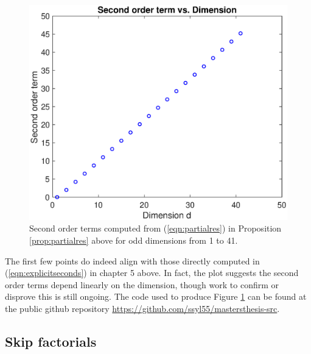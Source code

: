 \documentclass[11pt]{article}
\theoremstyle{mythm}
\begin{document}
\begin{figure}[h!]
\centerline{\includegraphics[width=12cm]{secs.eps}}\caption{\label{fig:secondsplot} Second order terms computed from (\ref{eqn:partialres}) in Proposition \ref{prop:partialres} above for odd dimensions from 1 to 41.}
\end{figure}

The first few points do indeed align with those directly computed in (\ref{eqn:explicitseconds}) in chapter 5 above. In fact, the plot suggests the second order terms depend linearly on the dimension, though work to confirm or disprove this is still ongoing. The code used to produce Figure \ref{fig:secondsplot} can be found at the public github repository \url{https://github.com/ssyl55/mastersthesis-src}.

\subsection{Skip factorials}
\end{document}
